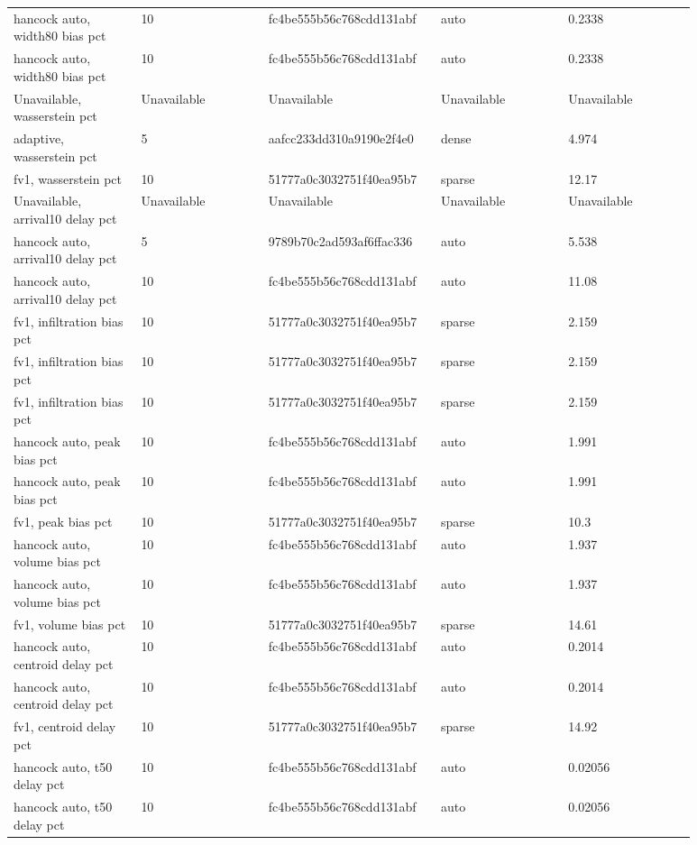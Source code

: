 \begin{longtable}{p{0.1760\linewidth}p{0.1760\linewidth}p{0.1760\linewidth}p{0.1760\linewidth}p{0.1760\linewidth}}
hancock auto, width80 bias pct & 10 & fc4be555b56c768cdd131abf & auto & 0.2338 \\
hancock auto, width80 bias pct & 10 & fc4be555b56c768cdd131abf & auto & 0.2338 \\
Unavailable, wasserstein pct & Unavailable & Unavailable & Unavailable & Unavailable \\
adaptive, wasserstein pct & 5 & aafcc233dd310a9190e2f4e0 & dense & 4.974 \\
fv1, wasserstein pct & 10 & 51777a0c3032751f40ea95b7 & sparse & 12.17 \\
Unavailable, arrival10 delay pct & Unavailable & Unavailable & Unavailable & Unavailable \\
hancock auto, arrival10 delay pct & 5 & 9789b70c2ad593af6ffac336 & auto & 5.538 \\
hancock auto, arrival10 delay pct & 10 & fc4be555b56c768cdd131abf & auto & 11.08 \\
fv1, infiltration bias pct & 10 & 51777a0c3032751f40ea95b7 & sparse & 2.159 \\
fv1, infiltration bias pct & 10 & 51777a0c3032751f40ea95b7 & sparse & 2.159 \\
fv1, infiltration bias pct & 10 & 51777a0c3032751f40ea95b7 & sparse & 2.159 \\
hancock auto, peak bias pct & 10 & fc4be555b56c768cdd131abf & auto & 1.991 \\
hancock auto, peak bias pct & 10 & fc4be555b56c768cdd131abf & auto & 1.991 \\
fv1, peak bias pct & 10 & 51777a0c3032751f40ea95b7 & sparse & 10.3 \\
hancock auto, volume bias pct & 10 & fc4be555b56c768cdd131abf & auto & 1.937 \\
hancock auto, volume bias pct & 10 & fc4be555b56c768cdd131abf & auto & 1.937 \\
fv1, volume bias pct & 10 & 51777a0c3032751f40ea95b7 & sparse & 14.61 \\
hancock auto, centroid delay pct & 10 & fc4be555b56c768cdd131abf & auto & 0.2014 \\
hancock auto, centroid delay pct & 10 & fc4be555b56c768cdd131abf & auto & 0.2014 \\
fv1, centroid delay pct & 10 & 51777a0c3032751f40ea95b7 & sparse & 14.92 \\
hancock auto, t50 delay pct & 10 & fc4be555b56c768cdd131abf & auto & 0.02056 \\
hancock auto, t50 delay pct & 10 & fc4be555b56c768cdd131abf & auto & 0.02056 \\

\end{longtable}
